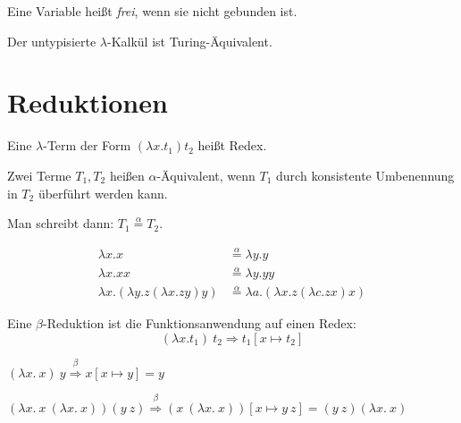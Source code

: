 \begin{definition}%
    Eine Variable heißt \textit{frei}, wenn sie nicht gebunden ist.
\end{definition}

\begin{satz}
    Der untypisierte $\lambda$-Kalkül ist Turing-Äquivalent.
\end{satz}

\section{Reduktionen}
\begin{definition}[Redex]%
    Eine $\lambda$-Term der Form $(\lambda x. t_1) t_2$ heißt Redex.
\end{definition}

\begin{definition}%
    Zwei Terme $T_1, T_2$ heißen $\alpha$-Äquivalent, wenn $T_1$ durch
    konsistente Umbenennung in $T_2$ überführt werden kann.

    Man schreibt dann: $T_1 \overset{\alpha}{=} T_2$.
\end{definition}

\begin{beispiel}
    \begin{align*}
        \lambda x.x    &\overset{\alpha}{=} \lambda y. y\\
        \lambda x. x x &\overset{\alpha}{=} \lambda y. y y\\
        \lambda x. (\lambda y. z (\lambda x. z y) y) &\overset{\alpha}{=}
        \lambda a. (\lambda x. z (\lambda c. z x) x)
    \end{align*}
\end{beispiel}

\begin{definition}%
    Eine $\beta$-Reduktion ist die Funktionsanwendung auf einen Redex:
    \[(\lambda x. t_1)\ t_2 \Rightarrow t_1 [x \mapsto t_2]\]
\end{definition}

\begin{beispiel}
    \begin{defenum}
        \item $(\lambda x.\ x)\ y \overset{\beta}{\Rightarrow} x[x \mapsto y] = y$
        \item $(\lambda x.\ x\ (\lambda x.\ x)) (y\ z) \overset{\beta}{\Rightarrow} (x\ (\lambda x.\ x))[x \mapsto y\ z] = (y\ z) (\lambda x.\ x)$
    \end{defenum}
\end{beispiel}

